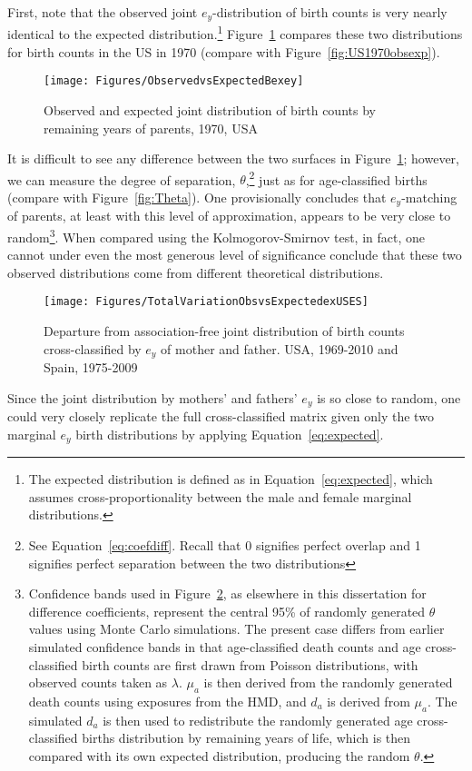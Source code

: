 \FloatBarrier
\label{sec:exobsexpected}
First, note that the observed joint $e_y$-distribution of birth counts is
very nearly identical to the expected distribution.\footnote{The expected
distribution is defined as in Equation~\eqref{eq:expected}, which assumes
cross-proportionality between the male and female marginal distributions.}
Figure~\ref{fig:US1970obsexpex} compares these two distributions for 
birth counts in the US in 1970 (compare with Figure~\ref{fig:US1970obsexp}). 

\begin{figure}[ht!]
        \centering  
          \caption{Observed and expected joint distribution of birth
          counts by remaining years of parents, 1970, USA}
           \texttt{[image: Figures/ObservedvsExpectedBexey]}
          \label{fig:US1970obsexpex}
\end{figure}

It is
difficult to see any difference between the two surfaces in
Figure~\ref{fig:US1970obsexpex}; however, we can measure the degree of
separation, $\theta$,\footnote{See Equation~\eqref{eq:coefdiff}. Recall that 0
signifies perfect overlap and 1 signifies perfect separation between the two
distributions} just as for age-classified births (compare with
Figure~\ref{fig:Theta}). One provisionally concludes that $e_y$-matching of
parents, at least with this level of approximation, appears to be very close to
random\footnote{Confidence bands used in Figure~\ref{fig:TotalVarobsexpex}, as
elsewhere in this dissertation for difference coefficients, represent the
central 95\% of randomly generated $\theta$ values using Monte Carlo
simulations. The present case differs from earlier simulated confidence bands in
that age-classified death counts and age cross-classified birth counts 
are first drawn from Poisson distributions, with
observed counts taken as $\lambda$. $\mu_a$ is then derived from the randomly
generated death counts using exposures from the HMD, and $d_a$ is derived from
$\mu_a$. The simulated $d_a$ is then used to redistribute the randomly generated
age cross-classified births distribution by remaining years of life, which is
then compared with its own expected distribution, producing the random $\theta$.}. 
When compared using the
Kolmogorov-Smirnov test, in fact, one cannot under even the most generous level
of significance conclude that these two observed distributions come from
different theoretical distributions.

\begin{figure}[ht!]
        \centering  
          \caption{Departure from association-free joint distribution of
          birth counts cross-classified by $e_y$ of mother and father. USA,
          1969-2010 and Spain, 1975-2009}
           \texttt{[image: Figures/TotalVariationObsvsExpectedexUSES]}
          \label{fig:TotalVarobsexpex}
\end{figure}

Since the joint distribution by mothers' and fathers' $e_y$ is so close
to random, one could very closely replicate the full cross-classified matrix 
given only the two marginal
$e_y$ birth distributions by applying Equation~\eqref{eq:expected}. 

\FloatBarrier
